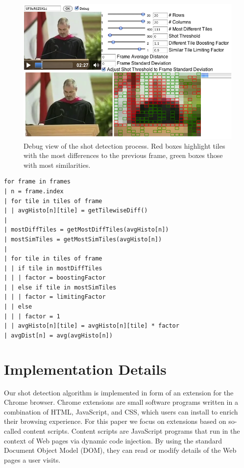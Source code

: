 \documentclass{acm_proc_article-sp}
\begin{document}
\begin{figure}
\begin{center}
   \includegraphics[width=0.9\linewidth]{./resources/algorithm.png}
\end{center}
   \caption{Debug view of the shot detection process. Red boxes highlight tiles with the most differences to the previous frame, green boxes those with most similarities.}
\label{fig:algorithm}
\end{figure}

\begin{lstlisting}[caption=Pseudocode of shot detection algorithm., label=code:algorithm, float]
for frame in frames
| n = frame.index  
| for tile in tiles of frame      
| | avgHisto[n][tile] = getTilewiseDiff()
|
| mostDiffTiles = getMostDiffTiles(avgHisto[n])
| mostSimTiles = getMostSimTiles(avgHisto[n])
|
| for tile in tiles of frame    
| | if tile in mostDiffTiles
| | | factor = boostingFactor
| | else if tile in mostSimTiles
| | | factor = limitingFactor
| | else
| | | factor = 1  
| | avgHisto[n][tile] = avgHisto[n][tile] * factor
| avgDist[n] = avg(avgHisto[n])
\end{lstlisting}

\section{Implementation Details} \label{sec:implementation}
Our shot detection algorithm is implemented in form of an extension for the Chrome browser. Chrome extensions are small software programs written in a combination of HTML, JavaScript, and CSS, which users can install to enrich their browsing experience. For this paper we focus on extensions based on so-called content scripts. Content scripts are JavaScript programs that run in the context of Web pages via dynamic code injection. By using the standard Document Object Model (DOM), they can read or modify details of the Web pages a user visits.
\end{document}
